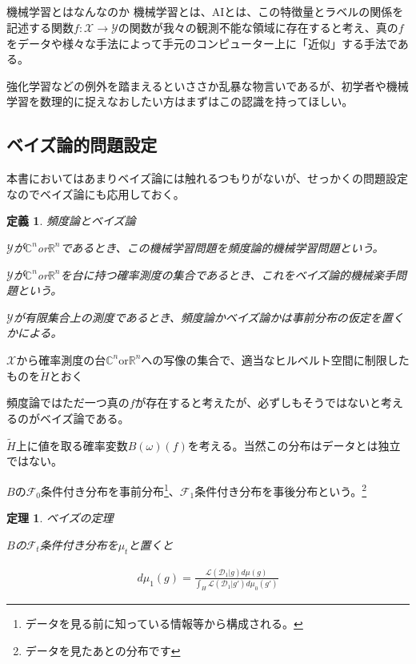 \documentclass{jsarticle}
\newtheorem{theo}{定理}[section]
\newtheorem{defi}{定義}[section]
\begin{document}
\subsection{}

\begin{itembox}[l]{機械学習とはなんなのか}
機械学習とは、AIとは、この特徴量とラベルの関係を記述する関数$f:\mathcal{X}\to \mathcal{Y}$の関数が我々の観測不能な領域に存在すると考え、真の$f$をデータや様々な手法によって手元のコンピューター上に「近似」する手法である。
\end{itembox}

強化学習などの例外を踏まえるといささか乱暴な物言いであるが、初学者や機械学習を数理的に捉えなおしたい方はまずはこの認識を持ってほしい。


\subsection{ベイズ論的問題設定}

本書においてはあまりベイズ論には触れるつもりがないが、せっかくの問題設定なのでベイズ論にも応用しておく。

\begin{defi} 頻度論とベイズ論

$\mathcal{Y}$が$\mathbb{C}^n$or$\mathbb{R}^n$であるとき、この機械学習問題を頻度論的機械学習問題という。

$\mathcal{Y}$が$\mathbb{C}^n$or$\mathbb{R}^n$を台に持つ確率測度の集合であるとき、これをベイズ論的機械楽手問題という。

$\mathcal{Y}$が有限集合上の測度であるとき、頻度論かベイズ論かは事前分布の仮定を置くかによる。

\end{defi}

$\mathcal{X}$から確率測度の台$\mathbb{C}^n$or$\mathbb{R}^n$への写像の集合で、適当なヒルベルト空間に制限したものを$\tilde{H}$とおく

頻度論ではただ一つ真の$f$が存在すると考えたが、必ずしもそうではないと考えるのがベイズ論である。

$\tilde{H}$上に値を取る確率変数$B(\omega)(f)$を考える。当然この分布はデータとは独立ではない。

$B$の$\mathcal{F}_0$条件付き分布を事前分布\footnote{データを見る前に知っている情報等から構成される。}、$\mathcal{F}_1$条件付き分布を事後分布という。\footnote{データを見たあとの分布です}

\begin{theo} ベイズの定理

$B$の$\mathcal{F}_t$条件付き分布を$\mu_t$と置くと

\begin{align}
d\mu_1(g) =\frac{\mathcal{L}(\mathcal{D}_1|g)d\mu(g)}{\int_H \mathcal{L}(\mathcal{D}_1|g')d\mu_0(g')}
\end{align}

\end{theo}
\end{document}
